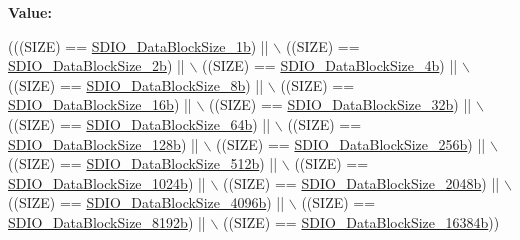 {\bfseries Value\+:}
\begin{DoxyCode}
(((SIZE) == \hyperlink{group___s_d_i_o___data___block___size_gaa86e90ddc3426b242a5230b3360c620d}{SDIO\_DataBlockSize\_1b}) || \(\backslash\)
                                  ((SIZE) == \hyperlink{group___s_d_i_o___data___block___size_ga7209d9d52635b66df85712c6fcd668ea}{SDIO\_DataBlockSize\_2b}) || \(\backslash\)
                                  ((SIZE) == \hyperlink{group___s_d_i_o___data___block___size_ga59cbaecfdebd63177d1208c268626f0a}{SDIO\_DataBlockSize\_4b}) || \(\backslash\)
                                  ((SIZE) == \hyperlink{group___s_d_i_o___data___block___size_ga14f91159c8c4faf49a335ed9b6a94d0b}{SDIO\_DataBlockSize\_8b}) || \(\backslash\)
                                  ((SIZE) == \hyperlink{group___s_d_i_o___data___block___size_ga52a7bdab9a75edd94d9c1152e8b078e2}{SDIO\_DataBlockSize\_16b}) || \(\backslash\)
                                  ((SIZE) == \hyperlink{group___s_d_i_o___data___block___size_gad0f89aa989c0cedf8d69eb28548413ca}{SDIO\_DataBlockSize\_32b}) || \(\backslash\)
                                  ((SIZE) == \hyperlink{group___s_d_i_o___data___block___size_ga981c219228ae8df11a501e15843338d4}{SDIO\_DataBlockSize\_64b}) || \(\backslash\)
                                  ((SIZE) == \hyperlink{group___s_d_i_o___data___block___size_gaba545c3a5e0f3296341d89a647cb9751}{SDIO\_DataBlockSize\_128b}) || \(\backslash\)
                                  ((SIZE) == \hyperlink{group___s_d_i_o___data___block___size_gaa099d7706f98a4fa6eb88277dc6680cf}{SDIO\_DataBlockSize\_256b}) || \(\backslash\)
                                  ((SIZE) == \hyperlink{group___s_d_i_o___data___block___size_gaa619848f7700962c5b7065f43e286e0b}{SDIO\_DataBlockSize\_512b}) || \(\backslash\)
                                  ((SIZE) == \hyperlink{group___s_d_i_o___data___block___size_ga7dad3c1c33e63a00eb6301b0a1135baf}{SDIO\_DataBlockSize\_1024b}) || \(\backslash\)
                                  ((SIZE) == \hyperlink{group___s_d_i_o___data___block___size_ga41eb937621c7ffcf2688c6bc0ea31464}{SDIO\_DataBlockSize\_2048b}) || \(\backslash\)
                                  ((SIZE) == \hyperlink{group___s_d_i_o___data___block___size_ga360411488abdbaf9eee9b99fca793f79}{SDIO\_DataBlockSize\_4096b}) || \(\backslash\)
                                  ((SIZE) == \hyperlink{group___s_d_i_o___data___block___size_gaf61913f3eff52c0f728db9ffbdaca7d2}{SDIO\_DataBlockSize\_8192b}) || \(\backslash\)
                                  ((SIZE) == \hyperlink{group___s_d_i_o___data___block___size_gae80bc49dbed677f7087d523c31fe10ae}{SDIO\_DataBlockSize\_16384b}))
\end{DoxyCode}


